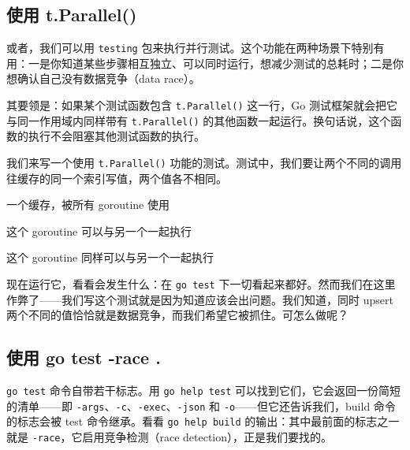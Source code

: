 \subsection{使用 t.Parallel()}

或者，我们可以用 \texttt{testing} 包来执行并行测试。这个功能在两种场景下特别有用：一是你知道某些步骤相互独立、可以同时运行，想减少测试的总耗时；二是你想确认自己没有数据竞争（data race）。

其要领是：如果某个测试函数包含 \texttt{t.Parallel()} 这一行，Go 测试框架就会把它与同一作用域内同样带有 \texttt{t.Parallel()} 的其他函数一起运行。换句话说，这个函数的执行不会阻塞其他测试函数的执行。

我们来写一个使用 \texttt{t.Parallel()} 功能的测试。测试中，我们要让两个不同的调用往缓存的同一个索引写值，两个值各不相同。


\begin{codeannotations}
\item 一个缓存，被所有 goroutine 使用
\item 这个 goroutine 可以与另一个一起执行
\item 这个 goroutine 同样可以与另一个一起执行
\end{codeannotations}

现在运行它，看看会发生什么：在 \texttt{go test} 下一切看起来都好。然而我们在这里作弊了——我们写这个测试就是因为知道应该会出问题。我们知道，同时 upsert 两个不同的值恰恰就是数据竞争，而我们希望它被抓住。可怎么做呢？

\subsection{使用 go test -race .}

\texttt{go test} 命令自带若干标志。用 \texttt{go help test} 可以找到它们，它会返回一份简短的清单——即 \texttt{-args}、\texttt{-c}、\texttt{-exec}、\texttt{-json} 和 \texttt{-o}——但它还告诉我们，build 命令的标志会被 test 命令继承。看看 \texttt{go help build} 的输出：其中最前面的标志之一就是 \texttt{-race}，它启用竞争检测（race detection），正是我们要找的。

